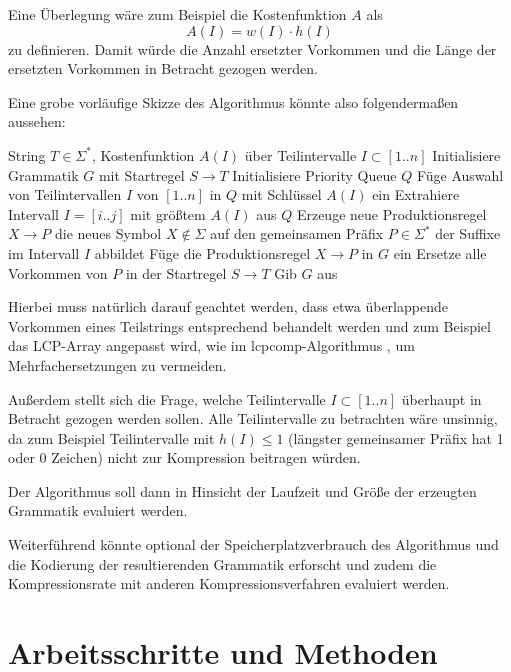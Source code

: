 Eine Überlegung wäre zum Beispiel die Kostenfunktion $A$ als 
\begin{equation*}
    A(I) = w(I) \cdot h(I)
\end{equation*}
zu definieren. Damit würde die Anzahl ersetzter Vorkommen und die Länge der ersetzten Vorkommen in Betracht gezogen werden.  

Eine grobe vorläufige Skizze des Algorithmus könnte also folgendermaßen aussehen:\\
\begin{algorithmic}[1]
    \REQUIRE String $T \in \Sigma^*$, Kostenfunktion $A(I)$ über Teilintervalle $I \subset [1..n]$
    \STATE Initialisiere Grammatik $G$ mit Startregel $S \rightarrow T$
    \STATE Initialisiere Priority Queue $Q$
    \STATE Füge Auswahl von Teilintervallen $I$ von $[1..n]$ in $Q$ mit Schlüssel $A(I)$ ein
        \STATE Extrahiere Intervall $I = [i..j]$ mit größtem $A(I)$ aus $Q$
        \STATE Erzeuge neue Produktionsregel $X \rightarrow P$ die neues Symbol $X \notin \Sigma$ auf den gemeinsamen Präfix $P \in \Sigma^*$ der Suffixe im Intervall $I$ abbildet
        \STATE Füge die Produktionsregel $X \rightarrow P$ in $G$ ein
        \STATE Ersetze alle Vorkommen von $P$ in der Startregel $S \rightarrow T$
    \ENDWHILE
    \STATE Gib $G$ aus
\end{algorithmic}

Hierbei muss natürlich darauf geachtet werden, dass etwa überlappende Vorkommen eines Teilstrings entsprechend behandelt werden und zum Beispiel das LCP-Array angepasst wird, wie im lcpcomp-Algorithmus \cite{dinklage_compression_2017}, um Mehrfachersetzungen zu vermeiden.

Außerdem stellt sich die Frage, welche Teilintervalle $I \subset [1..n]$ überhaupt in Betracht gezogen werden sollen. Alle Teilintervalle zu betrachten wäre unsinnig, da zum Beispiel Teilintervalle mit $h(I) \leq 1$ (längster gemeinsamer Präfix hat 1 oder 0 Zeichen) nicht zur Kompression beitragen würden.

Der Algorithmus soll dann in Hinsicht der Laufzeit und Größe der erzeugten Grammatik evaluiert werden. 

Weiterführend könnte optional der Speicherplatzverbrauch des Algorithmus und die Kodierung der resultierenden Grammatik erforscht \cite{tabei_succinct_2013} und zudem die Kompressionsrate mit anderen Kompressionsverfahren evaluiert werden. 

\section{Arbeitsschritte und Methoden}

